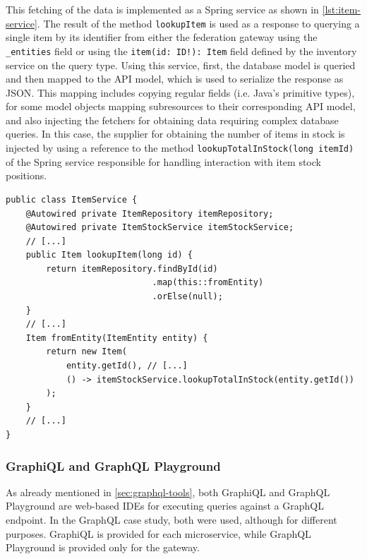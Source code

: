 This fetching of the data is implemented as a Spring service as shown in \autoref{lst:item-service}.
The result of the method \texttt{lookupItem} is used as a response to querying a single item by its identifier from either the federation gateway using the \texttt{\_entities} field or using the \texttt{item(id: ID!): Item} field defined by the inventory service on the query type.
Using this service, first, the database model is queried and then mapped to the \ac{API} model, which is used to serialize the response as \ac{JSON}.
This mapping includes copying regular fields (i.e. Java's primitive types), for some model objects mapping subresources to their corresponding \ac{API} model, and also injecting the fetchers for obtaining data requiring complex database queries.
In this case, the supplier for obtaining the number of items in stock is injected by using a reference to the method \texttt{lookupTotalInStock(long itemId)} of the Spring service responsible for handling interaction with item stock positions.

\begin{minipage}{\linewidth}
\begin{lstlisting}[caption={\acs{API} Model Creation with Fetcher Injection}, style=java-ext, label={lst:item-service}]
public class ItemService {
    @Autowired private ItemRepository itemRepository;
    @Autowired private ItemStockService itemStockService;
    // [...]
    public Item lookupItem(long id) {
        return itemRepository.findById(id)
                             .map(this::fromEntity)
                             .orElse(null);
    }
    // [...]
    Item fromEntity(ItemEntity entity) {
        return new Item(
            entity.getId(), // [...]
            () -> itemStockService.lookupTotalInStock(entity.getId())
        );
    }
    // [...]
}
\end{lstlisting}
\end{minipage}

\subsubsection{GraphiQL and GraphQL Playground}

As already mentioned in \autoref{sec:graphql-tools}, both GraphiQL and GraphQL Playground are web-based \acp{IDE} for executing queries against a GraphQL endpoint.
In the GraphQL case study, both were used, although for different purposes.
GraphiQL is provided for each microservice, while GraphQL Playground is provided only for the gateway.

